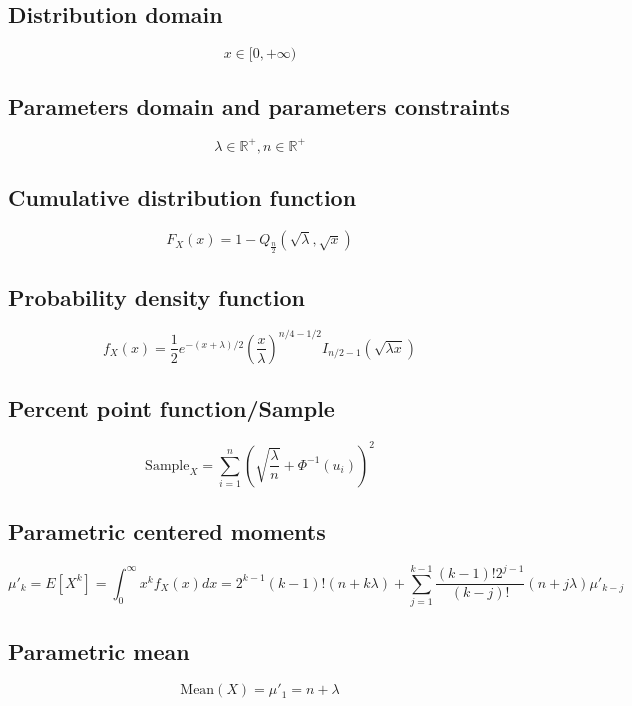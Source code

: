 \documentclass{article}
\begin{document}
\subsection{Distribution domain}
\begin{equation*} x\in [0,+\infty) \end{equation*}
\subsection{Parameters domain and parameters constraints}
\begin{equation*} \lambda\in\mathbb{R}^{+}, n\in\mathbb{R}^{+} \end{equation*}
\subsection{Cumulative distribution function}
\begin{equation*} F_{X}\left(x\right)=1-Q_{\frac{n}{2}}\left(\sqrt{\lambda},\sqrt{x}\right) \end{equation*}
\subsection{Probability density function}
\begin{equation*} f_{X}\left(x\right)=\frac{1}{2}e^{-(x+\lambda)/2} \left(\frac{x}{\lambda}\right)^{n/4-1/2}I_{n/2-1}(\sqrt{\lambda x}) \end{equation*}
\subsection{Percent point function/Sample}
\begin{equation*} \text{Sample}_{X}=\sum_{i=1}^{n}\left(\sqrt{\frac{\lambda}{n}}+\Phi^{-1}\left(u_{i}\right)\right)^{2} \end{equation*}
\subsection{Parametric centered moments}
\begin{equation*} \mu'_{k}=E[X^k]=\int_{0}^{\infty}x^{k}f_{X}\left(x\right)dx=2^{k-1}(k-1)!(n+k\lambda)+\sum_{j=1}^{k-1}\frac{(k-1)!2^{j-1}}{(k-j)!}(n+j\lambda )\mu'_{k-j} \end{equation*}
\subsection{Parametric mean}
\begin{equation*} \mathrm{Mean}(X)=\mu'_{1}=n+\lambda \end{equation*}
\end{document}
